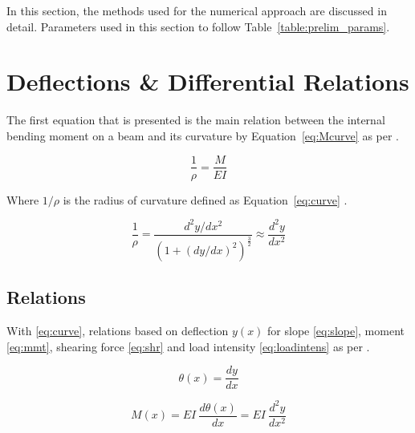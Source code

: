 \label{chapt:prelim}

In this section, the methods used for the numerical approach are discussed in detail. Parameters used in this section to follow Table~\ref{table:prelim_params}.\\


\section{Deflections \& Differential Relations}

The first equation that is presented is the main relation between the internal bending moment on a beam and its curvature by Equation~\ref{eq:Mcurve} as per \citep{nisbett2014shigley}. 

\begin{equation}
	\label{eq:Mcurve}
	\frac{1}{\rho}=\frac{M}{EI}
\end{equation}

Where $1/\rho$ is the radius of curvature defined as Equation~\ref{eq:curve} \citep{nisbett2014shigley}.

\begin{equation}
	\label{eq:curve}
	\frac{1}{\rho}=\frac{d^2y/dx^2}{\left( 1 +(dy/dx)^2 \right)^\frac{3}{2}} \approx \frac{d^2y}{dx^2}
\end{equation}

\subsection{Relations}

With \ref{eq:curve}, relations based on deflection $y(x)$ for slope \ref{eq:slope}, moment \ref{eq:mmt}, shearing force \ref{eq:shr} and load intensity \ref{eq:loadintens} as per \citep{nisbett2014shigley}.

\begin{equation}
	\label{eq:slope}
	\theta(x) = \frac{dy}{dx}
\end{equation}

\begin{equation}
	\label{eq:mmt}
	M(x) = EI\ \frac{d\theta(x)}{dx} = EI\ \frac{d^2y}{dx^2}
\end{equation}

